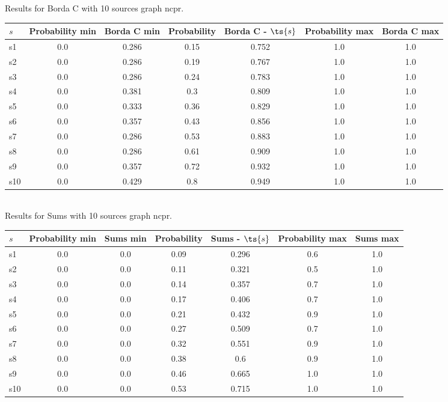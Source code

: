 \documentclass{article}
\begin{document}
\noindent Results for Borda C with 10 sources graph ncpr.

\noindent\begin{tabular}{|l|c|c|c|c|c|c|}
\hline
$s$& Probability min & Borda C min & Probability & Borda C - $\ts{s}$ & Probability max & Borda C max\\
\hline
s1 &0.0 & 0.286 & 0.15 & 0.752 & 1.0 & 1.0\\
\hline
s2 &0.0 & 0.286 & 0.19 & 0.767 & 1.0 & 1.0\\
\hline
s3 &0.0 & 0.286 & 0.24 & 0.783 & 1.0 & 1.0\\
\hline
s4 &0.0 & 0.381 & 0.3 & 0.809 & 1.0 & 1.0\\
\hline
s5 &0.0 & 0.333 & 0.36 & 0.829 & 1.0 & 1.0\\
\hline
s6 &0.0 & 0.357 & 0.43 & 0.856 & 1.0 & 1.0\\
\hline
s7 &0.0 & 0.286 & 0.53 & 0.883 & 1.0 & 1.0\\
\hline
s8 &0.0 & 0.286 & 0.61 & 0.909 & 1.0 & 1.0\\
\hline
s9 &0.0 & 0.357 & 0.72 & 0.932 & 1.0 & 1.0\\
\hline
s10 &0.0 & 0.429 & 0.8 & 0.949 & 1.0 & 1.0\\
\hline
\end{tabular}\\

\noindent Results for Sums with 10 sources graph ncpr.

\noindent\begin{tabular}{|l|c|c|c|c|c|c|}
\hline
$s$& Probability min & Sums min & Probability & Sums - $\ts{s}$ & Probability max & Sums max\\
\hline
s1 &0.0 & 0.0 & 0.09 & 0.296 & 0.6 & 1.0\\
\hline
s2 &0.0 & 0.0 & 0.11 & 0.321 & 0.5 & 1.0\\
\hline
s3 &0.0 & 0.0 & 0.14 & 0.357 & 0.7 & 1.0\\
\hline
s4 &0.0 & 0.0 & 0.17 & 0.406 & 0.7 & 1.0\\
\hline
s5 &0.0 & 0.0 & 0.21 & 0.432 & 0.9 & 1.0\\
\hline
s6 &0.0 & 0.0 & 0.27 & 0.509 & 0.7 & 1.0\\
\hline
s7 &0.0 & 0.0 & 0.32 & 0.551 & 0.9 & 1.0\\
\hline
s8 &0.0 & 0.0 & 0.38 & 0.6 & 0.9 & 1.0\\
\hline
s9 &0.0 & 0.0 & 0.46 & 0.665 & 1.0 & 1.0\\
\hline
s10 &0.0 & 0.0 & 0.53 & 0.715 & 1.0 & 1.0\\
\hline
\end{tabular}\\
\end{document}
